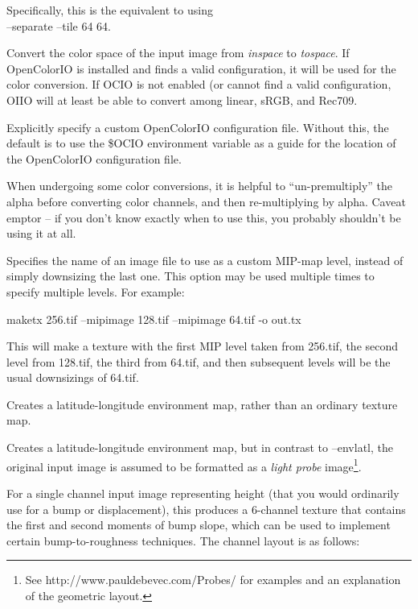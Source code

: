 Specifically, this is the equivalent to using \\
 {\cf --separate --tile 64 64}.
\apiend

Convert the color space of the input image from \emph{inspace} to
\emph{tospace}.  If OpenColorIO is installed and finds a valid
configuration, it will be used for the color conversion.  If OCIO
is not enabled (or cannot find a valid configuration, OIIO will at
least be able to convert among linear, sRGB, and Rec709.
\apiend

Explicitly specify a custom OpenColorIO configuration file. Without this,
the default is to use the {\cf \$OCIO} environment variable as a guide for
the location of the OpenColorIO configuration file.
\apiend

When undergoing some color conversions, it is helpful to
``un-premultiply'' the alpha before converting color channels, and then
re-multiplying by alpha.  Caveat emptor -- if you don't know exactly
when to use this, you probably shouldn't be using it at all.
\apiend


Specifies the name of an image file to use as a custom MIP-map level, 
instead of simply downsizing the last one.  This option may be used
multiple times to specify multiple levels.  For example:
\begin{code}
    maketx 256.tif --mipimage 128.tif --mipimage 64.tif -o out.tx
\end{code}
This will make a texture with the first MIP level taken from {\cf 256.tif},
the second level from {\cf 128.tif}, the third from {\cf 64.tif}, and
then subsequent levels will be the usual downsizings of {\cf 64.tif}.
\apiend

Creates a latitude-longitude environment map, rather than an ordinary
texture map.
\apiend

Creates a latitude-longitude environment map, but in contrast to
{\cf --envlatl}, the original input image is assumed to be formatted
as a \emph{light probe} image\footnote{See
{\cf http://www.pauldebevec.com/Probes/} for examples and an explanation
of the geometric layout.}.
\apiend

 
\NEW %
For a single channel input image representing height (that you would
ordinarily use for a bump or displacement), this produces a 6-channel
texture that contains the first and second moments of bump slope, which
can be used to implement certain bump-to-roughness techniques.
The channel layout is as follows:

